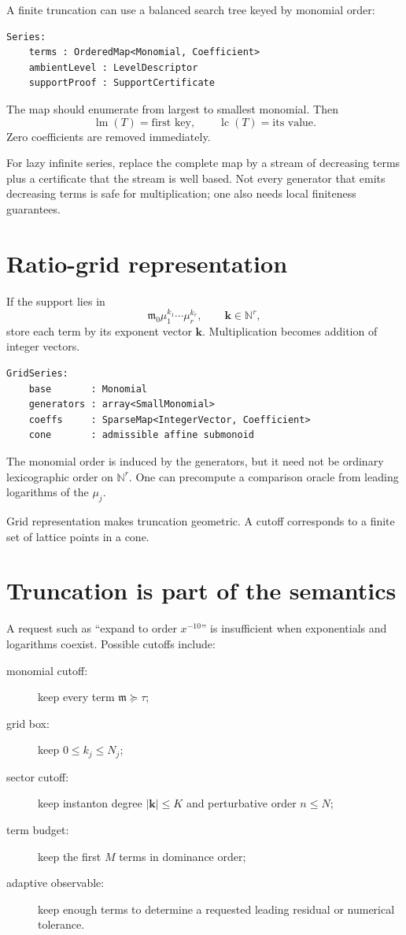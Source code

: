 \documentclass[11pt,openany]{book}
\theoremstyle{definition}
\theoremstyle{plain}
\theoremstyle{remark}
\newcommand{\N}{\mathbb{N}}
\newcommand{\m}{\mathfrak{m}}
\newcommand{\succeqdom}{\succcurlyeq}
\DeclareMathOperator{\lm}{lm}
\DeclareMathOperator{\lc}{lc}
\begin{document}
A finite truncation can use a balanced search tree keyed by monomial order:

\begin{lstlisting}[style=pseudo]
Series:
    terms : OrderedMap<Monomial, Coefficient>
    ambientLevel : LevelDescriptor
    supportProof : SupportCertificate
\end{lstlisting}

The map should enumerate from largest to smallest monomial. Then
\[
 \lm(T)=\text{first key},
 \qquad
 \lc(T)=\text{its value}.
\]
Zero coefficients are removed immediately.

For lazy infinite series, replace the complete map by a stream of decreasing terms plus a certificate that the stream is well based. Not every generator that emits decreasing terms is safe for multiplication; one also needs local finiteness guarantees.

\section{Ratio-grid representation}

If the support lies in
\[
 \m_0\mu_1^{k_1}\cdots\mu_r^{k_r},
 \qquad\mathbf k\in\N^r,
\]
store each term by its exponent vector $\mathbf k$. Multiplication becomes addition of integer vectors.

\begin{lstlisting}[style=pseudo]
GridSeries:
    base       : Monomial
    generators : array<SmallMonomial>
    coeffs     : SparseMap<IntegerVector, Coefficient>
    cone       : admissible affine submonoid
\end{lstlisting}

The monomial order is induced by the generators, but it need not be ordinary lexicographic order on $\N^r$. One can precompute a comparison oracle from leading logarithms of the $\mu_j$.

Grid representation makes truncation geometric. A cutoff corresponds to a finite set of lattice points in a cone.

\section{Truncation is part of the semantics}

A request such as ``expand to order $x^{-10}$'' is insufficient when exponentials and logarithms coexist. Possible cutoffs include:
\begin{description}
 \item[monomial cutoff:] keep every term $\m\succeqdom\tau$;
 \item[grid box:] keep $0\le k_j\le N_j$;
 \item[sector cutoff:] keep instanton degree $|\mathbf k|\le K$ and perturbative order $n\le N$;
 \item[term budget:] keep the first $M$ terms in dominance order;
 \item[adaptive observable:] keep enough terms to determine a requested leading residual or numerical tolerance.
\end{description}
\end{document}
